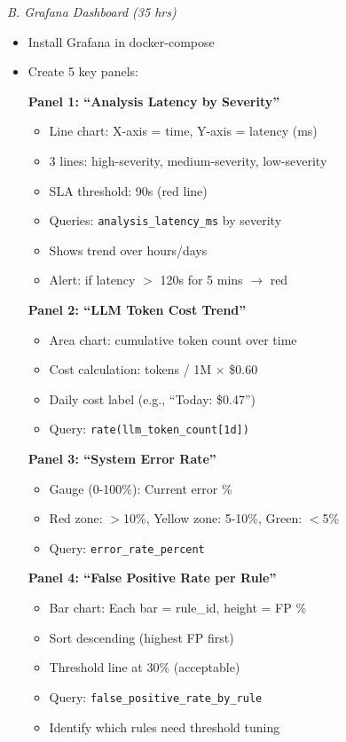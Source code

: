 \documentclass[11pt,a4paper]{article}
\begin{document}
\textit{B. Grafana Dashboard (35 hrs)}
\begin{itemize}[leftmargin=*]
    \item Install Grafana in docker-compose
    \item Create 5 key panels:

    \textbf{Panel 1: ``Analysis Latency by Severity''}
    \begin{itemize}
        \item Line chart: X-axis = time, Y-axis = latency (ms)
        \item 3 lines: high-severity, medium-severity, low-severity
        \item SLA threshold: 90s (red line)
        \item Queries: \texttt{analysis\_latency\_ms} by severity
        \item Shows trend over hours/days
        \item Alert: if latency $>$ 120s for 5 mins $\rightarrow$ red
    \end{itemize}

    \textbf{Panel 2: ``LLM Token Cost Trend''}
    \begin{itemize}
        \item Area chart: cumulative token count over time
        \item Cost calculation: tokens / 1M $\times$ \$0.60
        \item Daily cost label (e.g., ``Today: \$0.47'')
        \item Query: \texttt{rate(llm\_token\_count[1d])}
    \end{itemize}

    \textbf{Panel 3: ``System Error Rate''}
    \begin{itemize}
        \item Gauge (0-100\%): Current error \%
        \item Red zone: $>$10\%, Yellow zone: 5-10\%, Green: $<$5\%
        \item Query: \texttt{error\_rate\_percent}
    \end{itemize}

    \textbf{Panel 4: ``False Positive Rate per Rule''}
    \begin{itemize}
        \item Bar chart: Each bar = rule\_id, height = FP \%
        \item Sort descending (highest FP first)
        \item Threshold line at 30\% (acceptable)
        \item Query: \texttt{false\_positive\_rate\_by\_rule}
        \item Identify which rules need threshold tuning
    \end{itemize}


\end{itemize}
\end{document}
